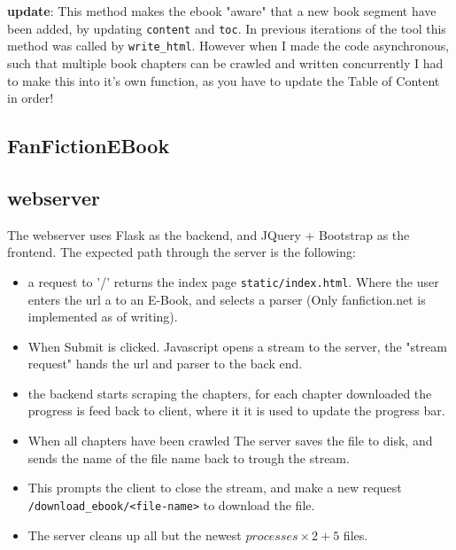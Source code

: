 \documentclass[]{report}   %
\begin{document}
\textbf{update}: This method makes the ebook "aware" that a new book segment
have been added, by updating \texttt{content} and \texttt{toc}. In previous
iterations of the tool this method was called by \texttt{write\_html}. However
when I made the code asynchronous, such that multiple book chapters can be
crawled and written concurrently I had to make this into it's own function, as
you have to update the Table of Content in order!

\subsection{FanFictionEBook}



\subsection{webserver}
The webserver uses Flask as the backend, and JQuery + Bootstrap as the frontend. The expected path through the server is the following:
\begin{itemize}
	\item a request to '/' returns the index page \texttt{static/index.html}.
		Where the user enters the url a to an E-Book, and selects a parser
		(Only fanfiction.net is implemented as of writing).
	\item When Submit is clicked. Javascript opens a stream to the server,
		the "stream request" hands the url and parser to the back end.
	\item the backend starts scraping the chapters, for each chapter downloaded
		the progress is feed back to client, where it it is used to update the
		progress bar.
	\item When all chapters have been crawled The server saves the file to
		disk, and sends the name of the file name back to trough the stream.
	\item This prompts the client to close the stream, and make a new request
		\texttt{/download\_ebook/<file-name>} to download the file.
	\item The server cleans up all but the newest $processes\times2 + 5$ files.
\end{itemize}
\end{document}

